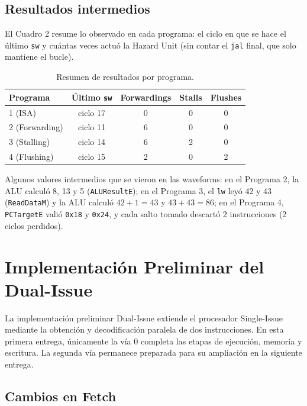\documentclass[12pt,a4paper]{article}
\begin{document}
\subsection{Resultados intermedios}

El Cuadro 2 resume lo observado en cada programa: el ciclo en que se hace el último \texttt{sw} y cuántas veces actuó la Hazard Unit (sin contar el \texttt{jal} final, que solo mantiene el bucle).

\begin{table}[H]
\centering
\begin{tabular}{lcccc}
\toprule
\textbf{Programa} & \textbf{Último \texttt{sw}} & \textbf{Forwardings} & \textbf{Stalls} & \textbf{Flushes} \\
\midrule
1 (ISA)         & ciclo 17 & 0 & 0 & 0 \\
2 (Forwarding)  & ciclo 11 & 6 & 0 & 0 \\
3 (Stalling)    & ciclo 14 & 6 & 2 & 0 \\
4 (Flushing)    & ciclo 15 & 2 & 0 & 2 \\
\bottomrule
\end{tabular}
\caption{Resumen de resultados por programa.}
\label{tab:resumen}
\end{table}

Algunos valores intermedios que se vieron en las waveforms: en el Programa 2, la ALU calculó 8, 13 y 5 (\texttt{ALUResultE}); en el Programa 3, el \texttt{lw} leyó 42 y 43 (\texttt{ReadDataM}) y la ALU calculó $42+1=43$ y $43+43=86$; en el Programa 4, \texttt{PCTargetE} valió \texttt{0x18} y \texttt{0x24}, y cada salto tomado descartó 2 instrucciones (2 ciclos perdidos).

\section{Implementación Preliminar del Dual-Issue}

La implementación preliminar Dual-Issue extiende el procesador Single-Issue mediante la obtención y decodificación paralela de dos instrucciones. En esta primera entrega, únicamente la vía 0 completa las etapas de ejecución, memoria y escritura. La segunda vía permanece preparada para su ampliación en la siguiente entrega.

\subsection{Cambios en Fetch}
\end{document}
